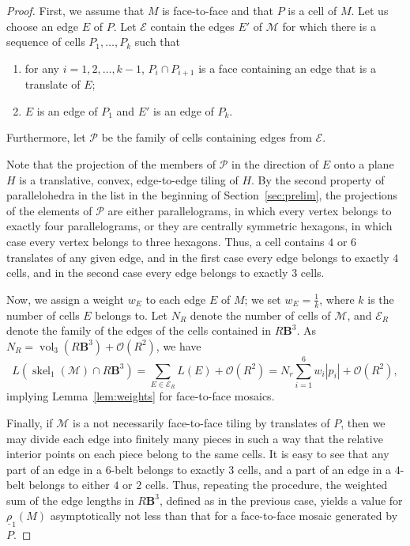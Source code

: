 \documentclass[twoside]{amsart}
\theoremstyle{definition}
\newcommand{\BB}{\mathbf B}
\newcommand{\M}{\mathcal{M}}
\DeclareMathOperator{\skel}{skel}
\DeclareMathOperator{\vol}{vol}
\begin{document}
\begin{proof}
First, we assume that $M$ is face-to-face and that $P$ is a cell of $M$.
Let us choose an edge $E$ of $P$. Let $\mathcal{E}$ contain the edges $E'$ of $\M$ for which there is a sequence of cells $P_1, \ldots, P_k$ such that
\begin{enumerate}
\item[(i)] for any $i=1,2,\ldots,k-1$, $P_i \cap P_{i+1}$ is a face containing an edge that is a translate of $E$;
\item[(ii)] $E$ is an edge of $P_1$ and $E'$ is an edge of $P_k$.
\end{enumerate}
Furthermore, let $\mathcal{P}$ be the family of cells containing edges from $\mathcal{E}$.

Note that the projection of the members of $\mathcal{P}$ in the direction of $E$ onto a plane $H$ is a translative, convex, edge-to-edge tiling of $H$. By the second property of parallelohedra in the list in the beginning of Section~\ref{sec:prelim}, the projections of the elements of $\mathcal{P}$ are either parallelograms, in which every vertex belongs to exactly four parallelograms, or they are centrally symmetric hexagons, in which case every vertex belongs to three hexagons. Thus, a cell contains $4$ or $6$ translates of any given edge, and in the first case every edge belongs to exactly $4$ cells, and in the second case every edge belongs to exactly $3$ cells.

Now, we assign a weight $w_E$ to each edge $E$ of $M$; we set $w_E = \frac{1}{k}$, where $k$ is the number of cells $E$ belongs to.
Let $N_R$ denote the number of cells of $\M$, and $\mathcal{E}_R$ denote the family of the edges of the cells contained in $R \BB^3$.
As $N_R = \vol_3(R \BB^3)+ \mathcal{O}(R^2)$, we have
\[
L(\skel_1 (\M) \cap R \BB^3) = \sum_{E \in \mathcal{E}_R} L(E)  + \mathcal{O}(R^2) = N_r \sum_{i=1}^6 w_i |p_i| + \mathcal{O}(R^2),
\]
implying Lemma~\ref{lem:weights} for face-to-face mosaics.

Finally, if $\M$ is a not necessarily face-to-face tiling by translates of $P$, then we may divide each edge into finitely many pieces in such a way that the relative interior points on each piece belong to the same cells. It is easy to see that any part of an edge in a $6$-belt belongs to exactly $3$ cells, and a part of an edge in a $4$-belt belongs to either $4$ or $2$ cells. Thus, repeating the procedure, the weighted sum of the edge lengths in $R \BB^3$, defined as in the previous case, yields a value for $\underline{\rho}_1(M)$ asymptotically not less than that for a face-to-face mosaic generated by $P$.
\end{proof}
\end{document}
